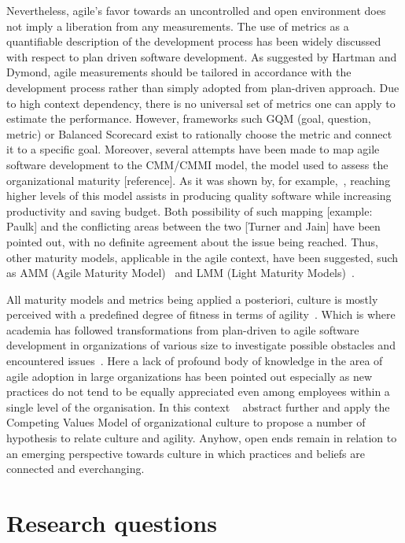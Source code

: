 \documentclass[paper=a4, fontsize=11pt]{scrartcl}
\numberwithin{equation}{section}		%
\numberwithin{figure}{section}			%
\numberwithin{table}{section}			%
\begin{document}
Nevertheless, agile's favor towards an uncontrolled and open environment does not imply a liberation from any measurements. The use of metrics as a quantifiable description of the development process has been widely discussed with respect to plan driven software development. As suggested by Hartman and Dymond, agile measurements should be tailored in accordance with the development process rather than simply adopted from plan-driven approach. Due to high context dependency, there is no universal set of metrics one can apply to estimate the performance. However, frameworks \textemdash such GQM (goal, question, metric) or Balanced Scorecard \textemdash exist to rationally choose the metric and connect it to a specific goal.
Moreover, several attempts have been made to map agile software development to the CMM/CMMI model, the model used to assess the organizational maturity [reference]. As it was shown by, for example,~\citet{pitterman2000maturity}, reaching higher levels of this model assists in producing quality software while increasing productivity and saving budget. Both possibility of such mapping [example: Paulk] and the conflicting areas between the two [Turner and Jain] have been pointed out, with no definite agreement about the issue being reached. Thus, other maturity models, applicable in the agile context, have been suggested, such as AMM (Agile Maturity Model)~\citep{chetankumar2009amm} and LMM (Light Maturity Models)~\citep{buglione2011lmm}.

All maturity models and metrics being applied a posteriori, culture is mostly perceived with a predefined degree of fitness in terms of agility~\citep{ivari2011orgagile}. Which is where academia has followed transformations from plan-driven to agile software development in organizations of various size to investigate possible obstacles and encountered issues~\citep{laanti2011nokia}. Here a lack of profound body of knowledge in the area of agile adoption in large organizations has been pointed out especially as new practices do not tend to be equally appreciated even among employees within a single level of the organisation. In this context ~\citet{ivari2011orgagile} abstract further and apply the Competing Values Model of organizational culture to propose a number of hypothesis to relate culture and agility. Anyhow, open ends remain in relation to an emerging perspective towards culture in which practices and beliefs are connected and everchanging.

\section{Research questions}
\end{document}
